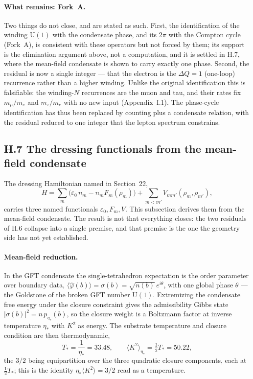 \documentclass[11pt]{article}
\begin{document}
\paragraph{What remains: Fork~A.}
Two things do not close, and are stated as such. First, the identification of the winding $\mathrm{U}(1)$ with the condensate phase, and its $2\pi$ with the Compton cycle (Fork~A), is consistent with these operators but not forced by them; its support is the elimination argument above, not a computation, and it is settled in H.7, where the mean-field condensate is shown to carry exactly one phase. Second, the residual is now a single integer --- that the electron is the $\Delta Q=1$ (one-loop) recurrence rather than a higher winding. Unlike the original identification this is falsifiable: the winding-$N$ recurrences are the muon and tau, and their rates fix $m_\mu/m_e$ and $m_\tau/m_e$ with no new input (Appendix~I.1). The phase-cycle identification has thus been replaced by counting plus a condensate relation, with the residual reduced to one integer that the lepton spectrum constrains.

\subsection*{H.7 The dressing functionals from the mean-field condensate}

The dressing Hamiltonian named in Section~22,
\[
H=\sum_m\big(\varepsilon_0\,n_m-n_m F_m(\rho_m)\big)+\sum_{m<m'}V_{mm'}(\rho_m,\rho_{m'}),
\]
carries three named functionals $\varepsilon_0,F_m,V$. This subsection derives them from the mean-field condensate. The result is not that everything closes: the two residuals of H.6 collapse into a single premise, and that premise is the one the geometry side has not yet established.

\paragraph{Mean-field reduction.}
In the GFT condensate the single-tetrahedron expectation is the order parameter over boundary data, $\langle\hat\varphi(b)\rangle=\sigma(b)=\sqrt{n(b)}\,e^{i\theta}$, with one global phase $\theta$ --- the Goldstone of the broken GFT number $\mathrm{U}(1)$. Extremizing the condensate free energy under the closure constraint gives the admissibility Gibbs state $|\sigma(b)|^2=n\,p_{\eta_*}(b)$, so the closure weight is a Boltzmann factor at inverse temperature $\eta_*$ with $K^2$ as energy. The substrate temperature and closure condition are then thermodynamic,
\[
T_*=\frac{1}{\eta_*}=33.48,\qquad \langle K^2\rangle_{\eta_*}=\tfrac32 T_*=50.22,
\]
the $3/2$ being equipartition over the three quadratic closure components, each at $\tfrac12 T_*$; this is the identity $\eta_*\langle K^2\rangle=3/2$ read as a temperature.
\end{document}

